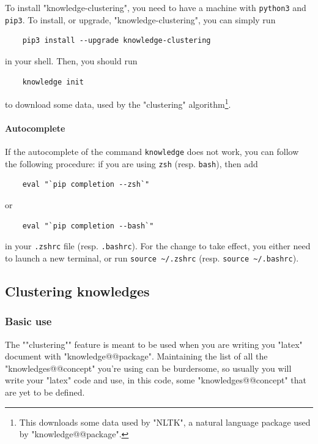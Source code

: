 \documentclass{article}
\begin{document}
To install "knowledge-clustering", you need to have a machine with
\verb|python3| and \verb|pip3|. To install, or upgrade, "knowledge-clustering",
you can simply run
\begin{verbatim}
    pip3 install --upgrade knowledge-clustering
\end{verbatim}
in your shell.
Then, you should run
\begin{verbatim}
    knowledge init
\end{verbatim}
to download some data, used by the "clustering" algorithm\footnote{This 
downloads some data used by "NLTK", a natural language package used by 
"knowledge@@package".}.

\paragraph{Autocomplete}
If the autocomplete of the command \verb|knowledge| does not work,
you can follow the following procedure:
if you are using \verb|zsh| (resp. \verb|bash|), then add
%
\begin{verbatim}
    eval "`pip completion --zsh`"
\end{verbatim}
or 
\begin{verbatim}
    eval "`pip completion --bash`"
\end{verbatim}
%
in your \verb|.zshrc| file (resp. \verb|.bashrc|).
For the change to take effect, you either need to launch a new terminal,
or run \verb|source ~/.zshrc| (resp. \verb|source ~/.bashrc|).

\subsection{Clustering knowledges}

\subsubsection{Basic use}

The \AP""clustering"" feature is meant to be used
when you are writing you "latex" document with "knowledge@@package".
Maintaining the list of all the "knowledges@@concept" you're using
can be burdersome, so usually you will write your "latex" code
and use, in this code, some "knowledges@@concept" that are yet to be
defined.
\end{document}
